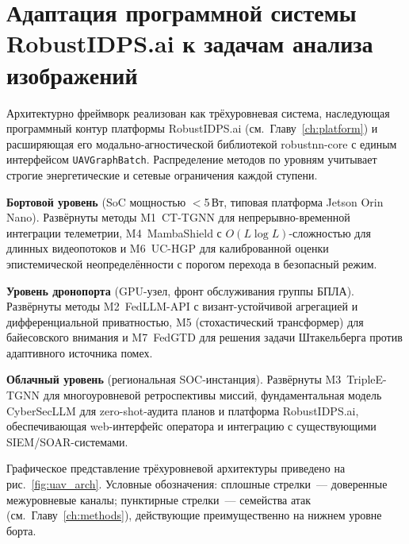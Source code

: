 \section{Адаптация программной системы RobustIDPS.ai к задачам анализа изображений}
\label{sec:uav_arch}

Архитектурно фреймворк реализован как трёхуровневая система, наследующая
программный контур платформы \textsf{RobustIDPS.ai}
(см.~Главу~\ref{ch:platform}) и расширяющая его модально-агностической
библиотекой \textsf{robustnn-core} с единым интерфейсом
\texttt{UAVGraphBatch}. Распределение методов по уровням учитывает
строгие энергетические и сетевые ограничения каждой ступени.

\noindent\textbf{Бортовой уровень} (SoC мощностью $<$5\,Вт, типовая
платформа Jetson Orin Nano). Развёрнуты методы \textsf{M1~CT-TGNN}
для непрерывно-временной интеграции телеметрии, \textsf{M4~MambaShield}
с $O(L\log L)$-сложностью для длинных видеопотоков и
\textsf{M6~UC-HGP} для калиброванной оценки эпистемической
неопределённости с порогом перехода в безопасный режим.

\noindent\textbf{Уровень дронопорта} (GPU-узел, фронт обслуживания
группы БПЛА). Развёрнуты методы \textsf{M2~FedLLM-API} с
визант-устойчивой агрегацией и дифференциальной приватностью,
\textsf{M5} (стохастический трансформер) для байесовского внимания и
\textsf{M7~FedGTD} для решения задачи Штакельберга против адаптивного
источника помех.

\noindent\textbf{Облачный уровень} (региональная SOC-инстанция).
Развёрнуты \textsf{M3~TripleE-TGNN} для многоуровневой ретроспективы
миссий, фундаментальная модель \textsf{CyberSecLLM} для zero-shot-аудита
планов и платформа \textsf{RobustIDPS.ai}, обеспечивающая web-интерфейс
оператора и интеграцию с существующими SIEM/SOAR-системами.

Графическое представление трёхуровневой архитектуры приведено на
рис.~\ref{fig:uav_arch}. Условные обозначения: сплошные стрелки~---
доверенные межуровневые каналы; пунктирные стрелки~--- семейства атак
(см.\ Главу~\ref{ch:methods}), действующие преимущественно на нижнем
уровне борта.

